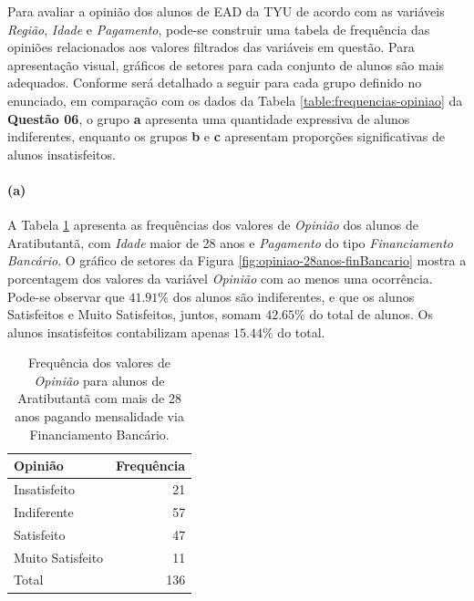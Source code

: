 \documentclass[10pt,a4paper,oneside]{article}
\newcommand{\arat}{Aratibutantã\xspace}
\begin{document}
Para avaliar a opinião dos alunos de EAD da TYU de acordo com as variáveis \textit{Região}, \textit{Idade} e \textit{Pagamento}, pode-se construir uma tabela de frequência das opiniões relacionados aos valores filtrados das variáveis em questão. Para apresentação visual, gráficos de setores para cada conjunto de alunos são mais adequados. Conforme será detalhado a seguir para cada grupo definido no enunciado, em comparação com os dados da Tabela \ref{table:frequencias-opiniao} da \textbf{Questão 06}, o grupo \textbf{a} apresenta uma quantidade expressiva de alunos indiferentes, enquanto os grupos \textbf{b} e \textbf{c} apresentam proporções significativas de alunos insatisfeitos.

\paragraph{(a)} A Tabela \ref{table:opiniao-28anos-finBancario} apresenta as frequências dos valores de \textit{Opinião} dos alunos de \arat, com \textit{Idade} maior de 28 anos e \textit{Pagamento} do tipo \textit{Financiamento Bancário}. O gráfico de setores da Figura \ref{fig:opiniao-28anos-finBancario} mostra a porcentagem dos valores da variável \textit{Opinião} com ao menos uma ocorrência.
Pode-se observar que $41.91\%$ dos alunos são indiferentes, e que os alunos Satisfeitos e Muito Satisfeitos, juntos, somam $42.65\%$ do total de alunos. Os alunos insatisfeitos contabilizam apenas $15.44\%$ do total.


\begin{table}[!h]
	\small
	\centering
	\caption{Frequência dos valores de \textit{Opinião} para alunos de \arat com mais de 28 anos pagando mensalidade via Financiamento Bancário.}
	\label{table:opiniao-28anos-finBancario}
	\begin{tabular}{l r}
		\toprule
		\textbf{Opinião} & \textbf{Frequência} \\
		\midrule
		Insatisfeito     &  21 \\
		Indiferente      &  57 \\
		Satisfeito       &  47 \\
		Muito Satisfeito &  11 \\
		\midrule
		Total            &  136 \\
		\bottomrule
	\end{tabular}
\end{table}
\end{document}
